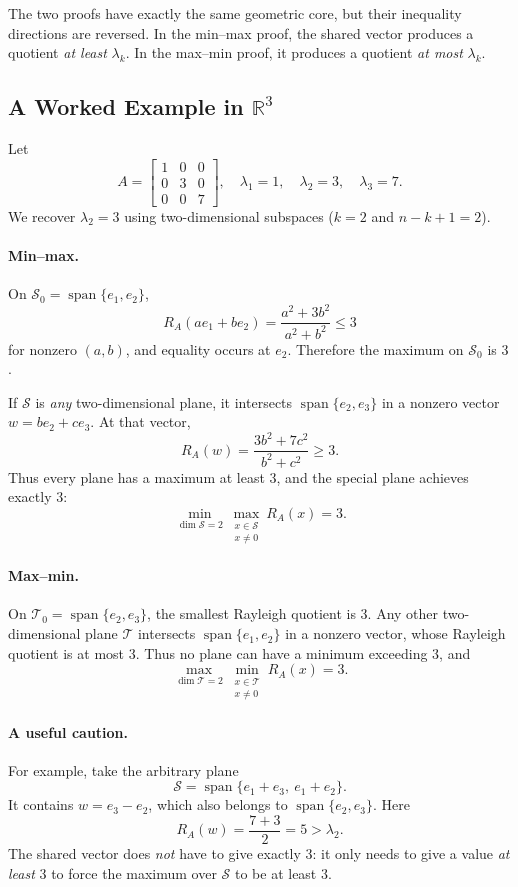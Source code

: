 \documentclass[14pt,letterpaper]{article}
\theoremstyle{plain}
\theoremstyle{definition}
\theoremstyle{remark}
\newcommand{\R}{\mathbb{R}}
\DeclareMathOperator{\Span}{span}
\begin{document}
The two proofs have exactly the same geometric core,
but their inequality directions are reversed. In the
min--max proof, the shared vector produces a quotient
\emph{at least} $\lambda_k$. In the max--min proof,
it produces a quotient \emph{at most} $\lambda_k$.

\subsection{A Worked Example in $\R^3$}
\label{subsec:courant_example}

Let
\[
A=\begin{bmatrix}1&0&0\\0&3&0\\0&0&7\end{bmatrix},
\quad
\lambda_1=1,\quad\lambda_2=3,\quad\lambda_3=7.
\]
We recover $\lambda_2=3$ using two-dimensional
subspaces ($k=2$ and $n-k+1=2$).

\paragraph{Min--max.}
On $\mathcal S_0=\Span\{e_1,e_2\}$,
\[
R_A(ae_1+be_2)=\frac{a^2+3b^2}{a^2+b^2}\leq3
\]
for nonzero $(a,b)$, and equality occurs at $e_2$.
Therefore the maximum on $\mathcal S_0$ is $3$.

If $\mathcal S$ is \emph{any} two-dimensional plane,
it intersects $\Span\{e_2,e_3\}$ in a nonzero vector
$w=be_2+ce_3$. At that vector,
\[
R_A(w)=\frac{3b^2+7c^2}{b^2+c^2}\geq3.
\]
Thus every plane has a maximum at least $3$,
and the special plane achieves exactly $3$:
\[
\boxed{
\min_{\dim\mathcal S=2}
\max_{\substack{x\in\mathcal S\\x\neq0}}R_A(x)=3.
}
\]

\paragraph{Max--min.}
On $\mathcal T_0=\Span\{e_2,e_3\}$, the smallest
Rayleigh quotient is $3$. Any other two-dimensional
plane $\mathcal T$ intersects $\Span\{e_1,e_2\}$
in a nonzero vector, whose Rayleigh quotient is at
most $3$. Thus no plane can have a minimum exceeding
$3$, and
\[
\boxed{
\max_{\dim\mathcal T=2}
\min_{\substack{x\in\mathcal T\\x\neq0}}R_A(x)=3.
}
\]

\paragraph{A useful caution.}
For example, take the arbitrary plane
\[
\mathcal S=\Span\{e_1+e_3,\ e_1+e_2\}.
\]
It contains $w=e_3-e_2$, which also belongs to
$\Span\{e_2,e_3\}$. Here
\[
R_A(w)=\frac{7+3}{2}=5>\lambda_2.
\]
The shared vector does \emph{not} have to give
exactly $3$: it only needs to give a value
\emph{at least} $3$ to force the maximum over
$\mathcal S$ to be at least $3$.
\end{document}
